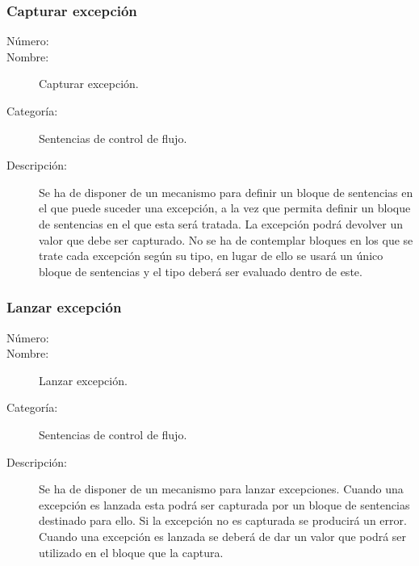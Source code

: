 \subsubsection{Capturar excepción}

	\begin{description}
		\item [Número:] \cn
		\item [Nombre:] Capturar excepción.
		\item [Categoría:] Sentencias de control de flujo.
		\item [Descripción:] Se ha de disponer de un mecanismo para definir un bloque de
sentencias en el que puede suceder una excepción, a la vez que permita definir un bloque de sentencias en el que esta será tratada. La excepción podrá devolver un valor que debe ser capturado.
No se ha de contemplar bloques en los que se trate cada excepción según su tipo, en lugar de ello se
usará un único bloque de sentencias y el tipo deberá ser evaluado dentro de este.
	\end {description}

\subsubsection{Lanzar excepción}

	\begin{description}
		\item [Número:] \cn
		\item [Nombre:] Lanzar excepción.
		\item [Categoría:] Sentencias de control de flujo.
		\item [Descripción:] Se ha de disponer de un mecanismo para lanzar excepciones. Cuando una excepción es lanzada esta podrá ser capturada por un bloque de sentencias destinado para ello. Si la excepción no es capturada se producirá un error. Cuando una excepción es lanzada se deberá de dar un valor que podrá ser utilizado en el bloque que la captura.
	\end {description}
